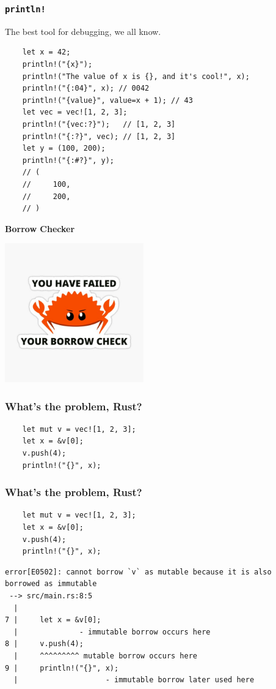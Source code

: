 \documentclass[aspectratio=1610,t]{beamer}
\begin{document}

\begin{frame}[fragile]
\frametitle{\texttt{println!}}
The best tool for debugging, we all know. 

\begin{verbatim}
    let x = 42;
    println!("{x}");
    println!("The value of x is {}, and it's cool!", x);
    println!("{:04}", x); // 0042
    println!("{value}", value=x + 1); // 43
    let vec = vec![1, 2, 3];
    println!("{vec:?}");   // [1, 2, 3]
    println!("{:?}", vec); // [1, 2, 3]
    let y = (100, 200);
    println!("{:#?}", y);
    // (
    //     100,
    //     200,
    // )
\end{verbatim}
\end{frame}


\begin{frame}
\center\Huge\textbf{Borrow Checker}

\includegraphics[height=6cm,keepaspectratio]{images/check-failed.jpeg}
\end{frame}


\begin{frame}[fragile]
\frametitle{What's the problem, Rust?}
\begin{verbatim}
    let mut v = vec![1, 2, 3];
    let x = &v[0];
    v.push(4);
    println!("{}", x);
\end{verbatim}
\end{frame}


\begin{frame}[fragile]
\frametitle{What's the problem, Rust?}
\begin{verbatim}
    let mut v = vec![1, 2, 3];
    let x = &v[0];
    v.push(4);
    println!("{}", x);
\end{verbatim}

\begin{verbatim}
error[E0502]: cannot borrow `v` as mutable because it is also
borrowed as immutable
 --> src/main.rs:8:5
  |
7 |     let x = &v[0];
  |              - immutable borrow occurs here
8 |     v.push(4);
  |     ^^^^^^^^^ mutable borrow occurs here
9 |     println!("{}", x);
  |                    - immutable borrow later used here
\end{verbatim}
\end{frame}
\end{document}
